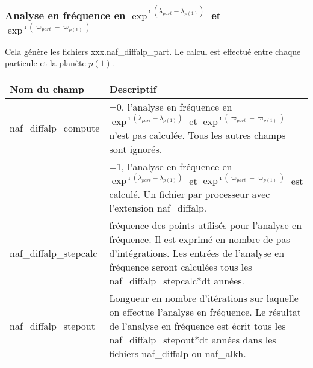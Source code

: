 \documentclass[11pt]{article}
\begin{document}
\vspace{0.5cm}
\subsubsection*{Analyse en fr\'equence en $\exp^{\imath(\lambda_{part}-\lambda_{p(1)})}$ et $\exp^{\imath(\varpi_{part}-\varpi_{p(1)})}$}
Cela g\'en\`ere les fichiers xxx.naf\_diffalp\_part. Le calcul est effectué entre chaque particule et la plan\`ete $p(1)$.

\begin{tabularx}{\textwidth}{|l|X|}
\hline
Nom du champ& Descriptif \\ \hline \hline
naf\_diffalp\_compute &=0, l'analyse en fr\'equence en $\exp^{\imath(\lambda_{part}-\lambda_{p(1)})}$ et $\exp^{\imath(\varpi_{part}-\varpi_{p(1)})}$ n'est pas calcul\'ee. Tous les autres champs sont ignor\'es.\\
&=1, l'analyse en fr\'equence en  $\exp^{\imath(\lambda_{part}-\lambda_{p(1)})}$ et $\exp^{\imath(\varpi_{part}-\varpi_{p(1)})}$ est calcul\'e. Un fichier par processeur avec l'extension naf\_diffalp.\\ \hline

naf\_diffalp\_stepcalc  & fr\'equence des points utilis\'es pour l'analyse en fr\'equence. Il est exprim\'e en nombre de pas d'int\'egrations. Les entr\'ees de l'analyse en fr\'equence seront calcul\'ees tous les naf\_diffalp\_stepcalc*dt ann\'ees. \\ \hline

naf\_diffalp\_stepout  & Longueur en nombre d'it\'erations sur laquelle on effectue l'analyse en fr\'equence. Le r\'esultat de l'analyse en fr\'equence est \'ecrit tous les naf\_diffalp\_stepout*dt ann\'ees dans les fichiers naf\_diffalp ou naf\_alkh.\\ \hline


\end{tabularx}
\end{document}
